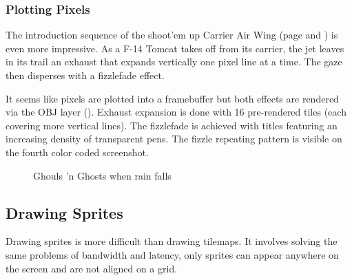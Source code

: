 \subsubsection{Plotting Pixels}

The introduction sequence of the shoot'em up Carrier Air Wing (page \pageref{caw_color} and \pageref{caw_rgb}) is even more impressive. As a F-14 Tomcat takes off from its carrier, the jet leaves in its trail an exhaust that expands vertically one pixel line at a time. The gaze then disperses with a fizzlefade effect. 

It seems like pixels are plotted into a framebuffer but both effects are rendered via the OBJ layer (). Exhaust expansion is done with 16 pre-rendered tiles (each covering more vertical lines). The fizzlefade is achieved with titles featuring an increasing density of transparent pens. The fizzle repeating pattern is visible on the fourth color coded screenshot.


 

\vfill
\begin{figure}[!b]
 \caption*{Ghouls 'n Ghosts when rain falls}%
 \end{figure}%
\pagebreak

 \label{caw_color}





\pagebreak


 \label{caw_rgb}





\pagebreak

\subsection{Drawing Sprites}
Drawing sprites is more difficult than drawing tilemaps. It involves solving the same problems of bandwidth and latency, only sprites can appear anywhere on the screen and are not aligned on a grid.

